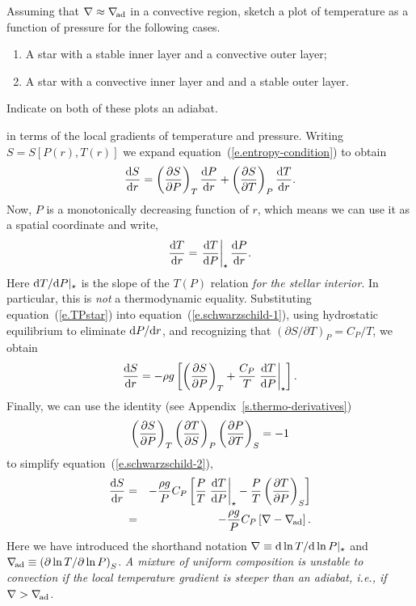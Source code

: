 \newpage
\begin{exercisebox}
Assuming that $\nabla \approx \nabla_{\!\mathrm{ad}}$ in a convective region, sketch a plot of temperature as a function of pressure for the following cases.
\begin{enumerate}
\item A star with a stable inner layer and a convective outer layer;
\item A star with a convective inner layer and and a stable outer layer.
\end{enumerate}
Indicate on both of these plots an adiabat.
\end{exercisebox}

 in terms of the local gradients of temperature and pressure. Writing $S = S[P(r),T(r)]$ we expand equation~(\ref{e.entropy-condition}) to obtain
\begin{equation}\label{e.schwarzschild-1}
\frac{\mathrm{d} S}{\mathrm{d} r} = \left(\frac{\partial S}{\partial P}\right)_{T} \frac{\mathrm{d} P}{\mathrm{d} r} + \left(\frac{\partial S}{\partial T}\right)_{P}\frac{\mathrm{d} T}{\mathrm{d} r} .
\end{equation}
Now, $P$ is a monotonically decreasing function of $r$, which means we can use it as a spatial coordinate and write,
\begin{equation}\label{e.TPstar}
\frac{\mathrm{d} T}{\mathrm{d} r} = \left.\frac{\mathrm{d} T}{\mathrm{d} P}\right|_{\star} \frac{\mathrm{d} P}{\mathrm{d} r} .
\end{equation}
Here $\mathrm{d} T/\mathrm{d} P|_{\star}$ is the slope of the $T(P)$ relation \emph{for the stellar interior}.  In particular, this is \emph{not} a thermodynamic equality. Substituting equation~(\ref{e.TPstar}) into equation~(\ref{e.schwarzschild-1}), using hydrostatic equilibrium to eliminate $\mathrm{d} P/\mathrm{d} r$, and recognizing that $(\partial S/\partial T)_{P} = C_{P}/T$, we obtain
\begin{equation}\label{e.schwarzschild-2}
\frac{\mathrm{d} S}{\mathrm{d} r} =  -\rho g\left[\left(\frac{\partial S}{\partial P}\right)_{T} + \frac{C_{P}}{T} \left.\frac{\mathrm{d} T}{\mathrm{d} P}\right|_{\star} \right].
\end{equation}
Finally, we can use the identity (see Appendix~\ref{s.thermo-derivatives})
\begin{equation}
\left(\frac{\partial S}{\partial P}\right)_{T}\left(\frac{\partial T}{\partial S}\right)_{P}\left(\frac{\partial P}{\partial T}\right)_{S} = -1
\end{equation}
to simplify equation~(\ref{e.schwarzschild-2}),
\begin{eqnarray}
\frac{\mathrm{d} S}{\mathrm{d} r} &=& -\frac{\rho g}{P}C_{P}\left[\frac{P}{T}\left.\frac{\mathrm{d} T}{\mathrm{d} P}\right|_{\star} - \frac{P}{T}\left(\frac{\partial T}{\partial P}\right)_{S}\right]\nonumber \\
 & = & -\frac{\rho g}{P}C_{P}\left[\nabla - \nabla_{\!\mathrm{ad}}\right].
 \label{e.schwarzschild}
\end{eqnarray}
Here we have introduced the shorthand notation $\nabla\equiv \mathrm{d} \ln T/\mathrm{d}\ln P|_{\star}$ and $\nabla_{\!\mathrm{ad}} \equiv \left(\partial \ln T/\partial\ln P\right)_{S}$.
\emph{A mixture of uniform composition is unstable to convection if the local temperature gradient is steeper than an adiabat, i.e., if $\nabla > \nabla_{\!\mathrm{ad}}$.}

